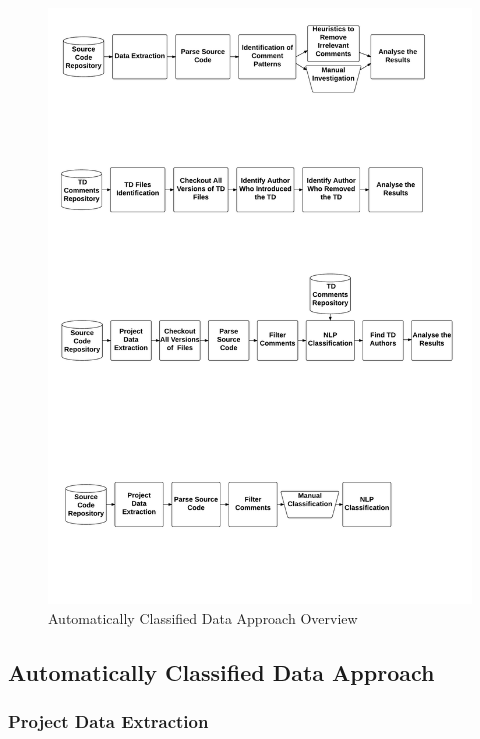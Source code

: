 \begin{figure}[thb!]
  \centering
  \includegraphics[width=1\textwidth]{figures/automatically_classified_data_approach.pdf}
  \caption{Automatically Classified Data Approach Overview}
  \label{fig:automatically_classified_data_approach_overview}
\end{figure}

\subsection*{Automatically Classified Data Approach}
\label{sub:automatically_classified_data_approach}


\subsubsection*{Project Data Extraction}
\label{subsub:project_data_extraction}

